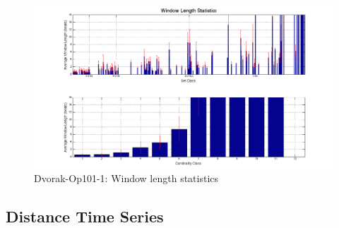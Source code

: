\documentclass{article}
\begin{document}
\begin{figure}[htb]
\centering
\includegraphics[width=.8\linewidth]{./plots/dvorakseg.png}
\caption{\label{fig:dvorakseg}Dvorak-Op101-1: Window length statistics}
\end{figure}
\subsection{Distance Time Series}
\label{sec-8-2}
\end{document}
